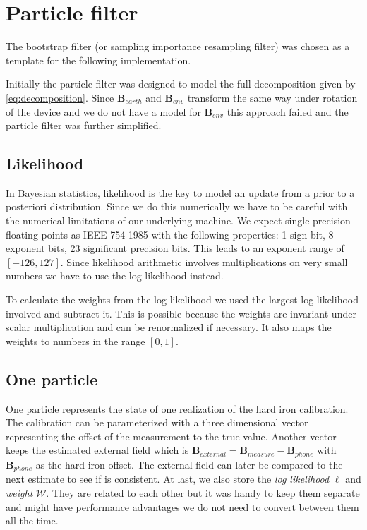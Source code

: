 \section{Particle filter}
\label{sec:impl_pf}


The bootstrap filter (or sampling importance resampling filter) was chosen as a template for the following implementation.\cite{Kuensch2013}\cite{Doucet2011}

Initially the particle filter was designed to model the full decomposition given by \ref{eq:decomposition}. Since $\bm{B}_{earth}$ and $\bm{B}_{env}$ transform the same way under rotation of the device and we do not have a model for $\bm{B}_{env}$ this approach failed and the particle filter was further simplified.

\subsection{Likelihood}

In Bayesian statistics, likelihood is the key to model an update from a prior to a posteriori distribution. Since we do this numerically we have to be careful with the numerical limitations of our underlying machine. We expect single-precision floating-points as IEEE 754-1985 with the following properties: 1 sign bit, 8 exponent bits, 23 significant precision bits. This leads to an exponent range of $[-126,127]$. Since likelihood arithmetic involves multiplications on very small numbers we have to use the log likelihood instead.

To calculate the weights from the log likelihood we used the largest log likelihood involved and subtract it. This is possible because the weights are invariant under scalar multiplication and can be renormalized if necessary. It also maps the weights to numbers in the range $[0, 1]$.

\subsection{One particle}

One particle represents the state of one realization of the hard iron calibration. The calibration can be parameterized with a three dimensional vector representing the offset of the measurement to the true value. Another vector keeps the estimated external field which is $\bm{B}_{external} = \bm{B}_{measure} - \bm{B}_{phone}$ with $\bm{B}_{phone}$ as the hard iron offset. The external field can later be compared to the next estimate to see if is consistent. At last, we also store the \textit{log likelihood} $\ell$ and \textit{weight} $\mathcal{W}$. They are related to each other but it was handy to keep them separate and might have performance advantages we do not need to convert between them all the time.

